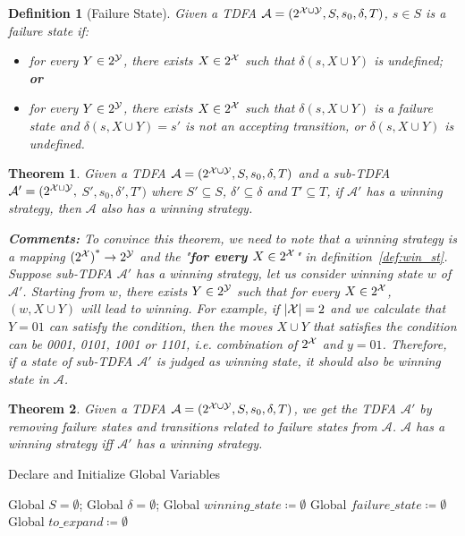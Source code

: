 \documentclass[10pt]{article}
\newtheorem{myDefinition}{Definition}
\newtheorem{myTheorem}{Theorem}
\begin{document}
\begin{myDefinition}[Failure State]
Given a TDFA $\mathcal{A} =(2^{\mathcal{X}\cup \mathcal{Y}},S,s_0,\delta,T)$, $s\in S$ is a failure state if:
\begin{itemize}
    \item for every $Y \in 2^{\mathcal{Y}}$, there exists $X \in2^{\mathcal{X}}$ such that $\delta(s,X \cup Y)$ is undefined; \textbf{or}
    \item for every $Y \in 2^{\mathcal{Y}}$, there exists $X \in2^{\mathcal{X}}$ such that $\delta(s,X \cup Y)$ is a failure state and $\delta(s,X \cup Y)=s'$ is not an accepting transition, or $\delta(s, X\cup Y)$ is undefined.
\end{itemize}
\end{myDefinition}

\begin{myTheorem}
Given a TDFA $\mathcal{A} =(2^{\mathcal{X} \cup \mathcal{Y}}, S, s_0, \delta, T)$ and a sub-TDFA $\mathcal{A}' =(2^{\mathcal{X} \cup \mathcal{Y}},$ $S',s_0,\delta',T')$ where $S'\subseteq S$, $\delta'\subseteq \delta$ and $T'\subseteq T$, if $\mathcal{A}'$ has a winning strategy, then $\mathcal{A}$ also has a winning strategy.

\textbf{Comments: } To convince this theorem, we need to note that a winning strategy is a mapping ${(2^{\mathcal{X}})}^*\to 2^{\mathcal{Y}}$ and the "\textbf{for every $X \in 2^{\mathcal{X}}$}" in definition~\ref{def:win_st}. Suppose sub-TDFA $\mathcal{A}'$ has a winning strategy, let us consider winning state $w$ of $\mathcal{A}'$. Starting from $w$, there exists $Y \in 2^{\mathcal{Y}}$ such that for every $X \in2^{\mathcal{X}}$, $(w, X \cup Y)$ will lead to winning. For example, if $|\mathcal{X}| = 2$ and we calculate that $Y = 01$ can satisfy the condition, then the moves $X \cup Y$ that satisfies the condition can be 0001, 0101, 1001 or 1101, i.e. combination of $2^{\mathcal{X}}$ and $y=01$. Therefore, if a state of sub-TDFA $\mathcal{A}'$ is judged as winning state, it should also be winning state in $\mathcal{A}$.
\end{myTheorem}

\begin{myTheorem}
Given a TDFA $\mathcal{A} =(2^{\mathcal{X} \cup \mathcal{Y}}, S, s_0, \delta, T)$, we get the TDFA $\mathcal{A}'$ by removing failure states and transitions related to failure states from $\mathcal{A}$. $\mathcal{A}$ has a winning strategy iff $\mathcal{A}'$ has a winning strategy.
\end{myTheorem}

\begin{algorithm}[h]
\Large
\caption{Declare and Initialize Global Variables}
\label{algo:init}
Global $S=\emptyset$;   
Global $\delta=\emptyset$;  
Global $winning\_state\coloneqq\emptyset$\;
Global $failure\_state\coloneqq\emptyset$\;
Global $to\_expand \coloneqq\emptyset$\;
\end{algorithm}
\end{document}
